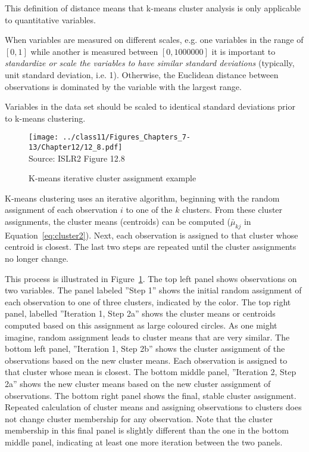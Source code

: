 \begin{infobox}
\noindent This definition of distance means that k-means cluster analysis is only applicable to quantitative variables. 
\end{infobox}

When variables are measured on different scales, e.g. one variables in the range of $[0, 1]$ while another is measured between $[0, 1000000]$ it is important to \emph{standardize or scale the variables to have similar standard deviations} (typically, unit standard deviation, i.e. 1). Otherwise, the Euclidean distance between observations is dominated by the variable with the largest range.

\begin{alertbox}
Variables in the data set should be scaled to identical standard deviations prior to k-means clustering.
\end{alertbox}

\begin{figure}
\centering
\texttt{[image: ../class11/Figures\_Chapters\_7-13/Chapter12/12\_8.pdf]} \\

\scriptsize Source: ISLR2 Figure 12.8
\caption{K-means iterative cluster assignment example}
\label{fig:kmeans1}
\end{figure}

K-means clustering uses an iterative algorithm, beginning with the random assignment of each observation $i$ to one of the $k$ clusters. From these cluster assignments, the cluster means (centroids) can be computed ($\bar{\mu}_{kj}$ in Equation~\ref{eq:cluster2}). Next, each observation is assigned to that cluster whose centroid is closest. The last two steps are repeated until the cluster assignments no longer change. 

This process is illustrated in Figure~\ref{fig:kmeans1}. The top left panel shows observations on two variables. The panel labeled ''Step 1'' shows the initial random assignment of each observation to one of three clusters, indicated by the color. The top right panel, labelled ''Iteration 1, Step 2a'' shows the cluster means or centroids computed based on this assignment as large coloured circles. As one might imagine, random assignment leads to cluster means that are very similar. The bottom left panel, ''Iteration 1, Step 2b'' shows the cluster assignment of the observations based on the new cluster means. Each observation is assigned to that cluster whose mean is closest. The bottom middle panel, ''Iteration 2, Step 2a'' shows the new cluster means based on the new cluster assignment of observations. The bottom right panel shows the final, stable cluster assignment. Repeated calculation of cluster means and assigning observations to clusters does not change cluster membership for any observation. Note that the cluster membership in this final panel is slightly different than the one in the bottom middle panel, indicating at least one more iteration between the two panels. 

